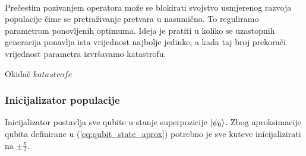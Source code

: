 \documentclass[times, utf8, zavrsni, numeric]{fer}
\begin{document}
\paragraph{}
Prečestim pozivanjem operatora može se blokirati svojstvo usmjerenog razvoja populacije čime se pretraživanje pretvara u nasumično. To reguliramo parametrom ponovljenih optimuma. Ideja je pratiti u koliko se uzastopnih generacija ponavlja ista vrijednost najbolje jedinke, a kada taj broj prekorači vrijednost parametra izvršavamo katastrofu.
\begin{algorithm}
\caption{Okidač $katastrofe$}
\label{algo:katastrofa_okidac}
\begin{algorithmic}
\ELSE
{}
\ENDIF
{}
\end{algorithmic}
\end{algorithm}

\subsubsection{Inicijalizator populacije}
Inicijalizator postavlja sve qubite u stanje superpozicije $\ket{\psi_0}$.
 Zbog aproksimacije qubita definirane u (\ref{eq:qubit_state_aprox}) potrebno je sve kuteve inicijalizirati na $\pm\frac{\pi}{2}$.
 
\end{document}
